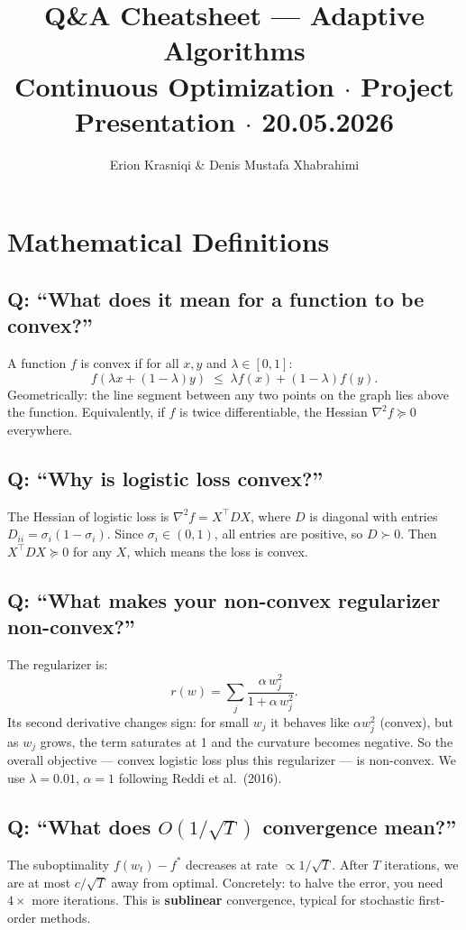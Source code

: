 \documentclass[10pt,a4paper]{article}
\title{\textbf{Q\&A Cheatsheet --- Adaptive Algorithms}\\[4pt]
\large Continuous Optimization $\cdot$ Project Presentation $\cdot$ 20.05.2026}
\author{Erion Krasniqi \& Denis Mustafa Xhabrahimi}
\date{}
\begin{document}
\maketitle
\vspace{-1em}

\section{Mathematical Definitions}

\subsection{Q: ``What does it mean for a function to be convex?''}
A function $f$ is convex if for all $x, y$ and $\lambda \in [0,1]$:
\[
  f(\lambda x + (1-\lambda)y) \;\leq\; \lambda f(x) + (1-\lambda)f(y).
\]
Geometrically: the line segment between any two points on the graph lies above the function.
Equivalently, if $f$ is twice differentiable, the Hessian $\nabla^2 f \succeq 0$ everywhere.

\subsection{Q: ``Why is logistic loss convex?''}
The Hessian of logistic loss is $\nabla^2 f = X^\top D X$, where $D$ is diagonal with entries $D_{ii} = \sigma_i(1-\sigma_i)$.
Since $\sigma_i \in (0,1)$, all entries are positive, so $D \succ 0$.
Then $X^\top D X \succeq 0$ for any $X$, which means the loss is convex.

\subsection{Q: ``What makes your non-convex regularizer non-convex?''}
The regularizer is:
\[
  r(w) = \sum_{j} \frac{\alpha\, w_j^2}{1 + \alpha\, w_j^2}.
\]
Its second derivative changes sign: for small $w_j$ it behaves like $\alpha w_j^2$ (convex), but as $w_j$ grows, the term saturates at 1 and the curvature becomes negative.
So the overall objective --- convex logistic loss plus this regularizer --- is non-convex.
We use $\lambda = 0.01$, $\alpha = 1$ following Reddi et al.\ (2016).

\subsection{Q: ``What does $O(1/\sqrt{T})$ convergence mean?''}
The suboptimality $f(w_t) - f^*$ decreases at rate $\propto 1/\sqrt{T}$.
After $T$ iterations, we are at most $c/\sqrt{T}$ away from optimal.
Concretely: to halve the error, you need $4\times$ more iterations.
This is \textbf{sublinear} convergence, typical for stochastic first-order methods.
\end{document}
